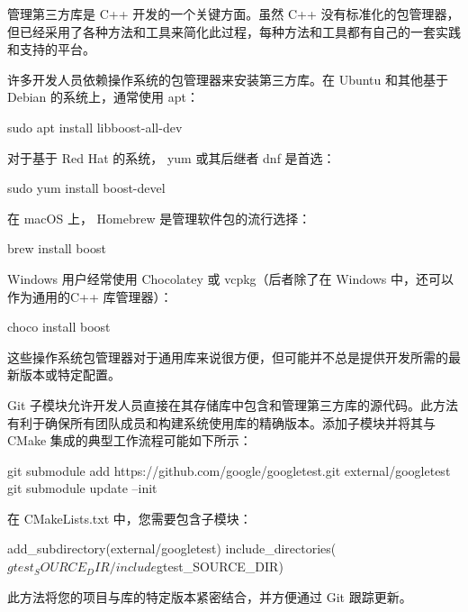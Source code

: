 
管理第三方库是 C++ 开发的一个关键方面。虽然 C++ 没有标准化的包管理器，但已经采用了各种方法和工具来简化此过程，每种方法和工具都有自己的一套实践和支持的平台。


许多开发人员依赖操作系统的包管理器来安装第三方库。在 Ubuntu 和其他基于 Debian 的系统上，通常使用 apt：

\begin{shell}
sudo apt install libboost-all-dev
\end{shell}

对于基于 Red Hat 的系统， yum 或其后继者 dnf 是首选：

\begin{shell}
sudo yum install boost-devel
\end{shell}

在 macOS 上， Homebrew 是管理软件包的流行选择：

\begin{shell}
brew install boost
\end{shell}

Windows 用户经常使用 Chocolatey 或 vcpkg（后者除了在 Windows 中，还可以作为通用的C++ 库管理器）：

\begin{shell}
choco install boost
\end{shell}

这些操作系统包管理器对于通用库来说很方便，但可能并不总是提供开发所需的最新版本或特定配置。


Git 子模块允许开发人员直接在其存储库中包含和管理第三方库的源代码。此方法有利于确保所有团队成员和构建系统使用库的精确版本。添加子模块并将其与 CMake 集成的典型工作流程可能如下所示：

\begin{shell}
git submodule add https://github.com/google/googletest.git external/googletest
git submodule update --init
\end{shell}

在 CMakeLists.txt 中，您需要包含子模块：

\begin{cmake}
add_subdirectory(external/googletest)
include_directories(${gtest_SOURCE_DIR}/include ${gtest_SOURCE_DIR})
\end{cmake}

此方法将您的项目与库的特定版本紧密结合，并方便通过 Git 跟踪更新。

